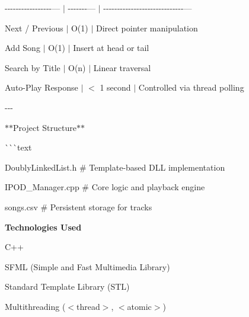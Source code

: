 -\/-\/-\/-\/-\/-\/-\/-\/-\/-\/-\/-\/-\/-\/-\/-\/-\/--- \texorpdfstring{$\vert$}{|} -\/-\/-\/-\/-\/-\/-\/--- \texorpdfstring{$\vert$}{|} -\/-\/-\/-\/-\/-\/-\/-\/-\/-\/-\/-\/-\/-\/-\/-\/-\/-\/-\/-\/-\/-\/-\/-\/-\/-\/-\/-\/-\/---

Next /\+ Previous \texorpdfstring{$\vert$}{|} O(1) \texorpdfstring{$\vert$}{|} Direct pointer manipulation

Add Song \texorpdfstring{$\vert$}{|} O(1) \texorpdfstring{$\vert$}{|} Insert at head or tail

Search by Title \texorpdfstring{$\vert$}{|} O(n) \texorpdfstring{$\vert$}{|} Linear traversal

Auto-\/\+Play Response \texorpdfstring{$\vert$}{|} \texorpdfstring{$<$}{<} 1 second \texorpdfstring{$\vert$}{|} Controlled via thread polling

-\/-\/-\/

\texorpdfstring{$\ast$}{*}\texorpdfstring{$\ast$}{*}\+Project Structure\texorpdfstring{$\ast$}{*}\texorpdfstring{$\ast$}{*}

\`{}\`{}\`{}text

Doubly\+Linked\+List.\+h \# Template-\/based DLL implementation

IPOD\+\_\+\+Manager.\+cpp \# Core logic and playback engine

songs.\+csv \# Persistent storage for tracks

{\bfseries{Technologies Used}}

C++

SFML (Simple and Fast Multimedia Library)

Standard Template Library (STL)

Multithreading ($<$thread$>$, $<$atomic$>$) 